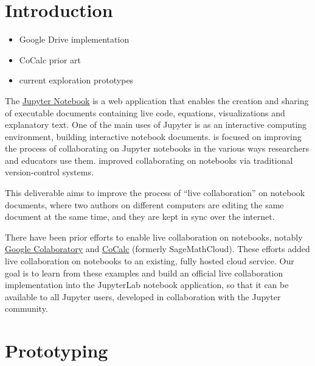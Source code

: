 \documentclass{deliverablereport}
\author{Benjamin Ragan-Kelley, Vidar Tonaas Fauske}
\begin{document}
\maketitle
\tableofcontents


\section{Introduction}

\begin{itemize}
  \item Google Drive implementation
  \item CoCalc prior art
  \item current exploration prototypes
\end{itemize}

The \href{https://jupyter.org}{Jupyter Notebook} is a web application
that enables the creation and sharing of executable documents
containing live code, equations, visualizations and explanatory text.
One of the main uses of Jupyter is as an interactive computing environment,
building interactive notebook documents.
 is focused on improving the process of collaborating
on Jupyter notebooks in the various ways researchers and educators use them.
 improved collaborating on notebooks via traditional version-control systems.

This deliverable aims to improve the process of ``live collaboration'' on notebook documents,
where two authors on different computers are editing the same document at the same time,
and they are kept in sync over the internet.

There have been prior efforts to enable live collaboration on notebooks,
notably \href{https://colaboratory.google.com}{Google Colaboratory}
and \href{https://cocalc.com}{CoCalc} (formerly SageMathCloud).
These efforts added live collaboration on notebooks to an existing,
fully hosted cloud service.
Our goal is to learn from these examples and build an official live collaboration implementation into the JupyterLab notebook application,
so that it can be available to all Jupyter users,
developed in collaboration with the Jupyter community.


\section{Prototyping}
\end{document}
